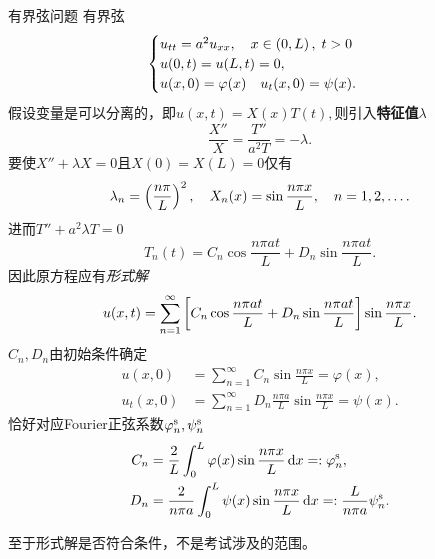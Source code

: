 \begin{example}{有界弦问题}{}
	有界弦
	\begin{align*}
		\begin{cases}
			u_{tt}=a^2u_{xx},\quad x\in\left(0,L\right),\;t>0 \\
			u(0,t)=u(L,t)=0,                 \\
			u(x,0)=\varphi(x)\quad u_t(x,0)=\psi(x).
		\end{cases}
	\end{align*}
	假设变量是可以分离的，即$u(x,t)=X(x)T(t),$则引入\textbf{特征值}$\lambda$
	\[
		\frac{X''}X=\frac{T''}{a^2T}=-\lambda.
	\]
	要使$X''+\lambda X=0$且$X(0)=X(L)=0$仅有
	\[
		\lambda_n=\left(\frac{n\pi}L\right)^2,\quad X_n(x)=\sin\frac{n\pi x}L,\quad n=1,2,\ldots.
	\]
	进而$T''+a^2\lambda T=0$
	\[
		T_n(t)=C_n\cos\frac{n\pi at}L+D_n\sin\frac{n\pi at}L.
	\]
	因此原方程应有\textit{形式解}
	\begin{align}
		u(x,t)=\sum_{n=1}^\infty\left[C_n\cos\frac{n\pi at}L+D_n\sin\frac{n\pi at}L\right]\sin\frac{n\pi x}L.
	\end{align}
	$C_n,D_n$由初始条件确定
	\begin{align*}
		u(x,0)&=\sum_{n=1}^\infty C_n\sin\frac{n\pi x}L=\varphi(x),            \\
		u_t(x,0)&=\sum_{n=1}^\infty D_n\frac{n\pi a}L\sin\frac{n\pi x}L=\psi(x).
	\end{align*}
	恰好对应Fourier正弦系数$\varphi^{\mathrm s}_n,\psi^{\mathrm s}_n$
	\begin{align*}
		C_n & =\frac2L\int_0^L\varphi(x)\sin\frac{n\pi x}L\mathop{}\!\mathrm{d} x=:\varphi_n^{\mathrm s},                  \\
		D_n & =\frac2{n\pi a}\int_0^L\psi(x)\sin\frac{n\pi x}L\mathop{}\!\mathrm{d} x=:\frac{L}{n\pi a}\psi_n^{\mathrm s}.
	\end{align*}
	
	至于形式解是否符合条件，不是考试涉及的范围。
\end{example}
